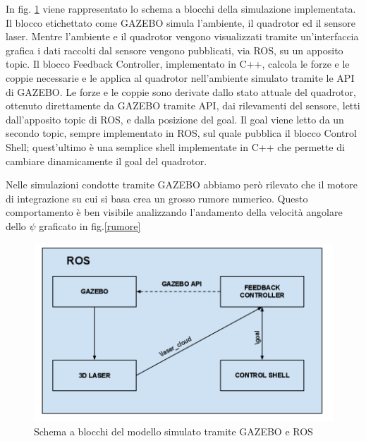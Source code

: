 \documentclass[a4paper,10pt]{article}
\begin{document}
In fig. \ref{GAZ_ROS} viene rappresentato lo schema a blocchi della simulazione implementata. Il blocco etichettato come GAZEBO simula l'ambiente, il quadrotor ed il sensore laser. Mentre l'ambiente e il quadrotor vengono visualizzati tramite un'interfaccia grafica i dati raccolti dal sensore vengono pubblicati, via ROS, su un apposito topic. Il blocco Feedback Controller, implementato in C++, calcola le forze e le coppie necessarie e le applica al quadrotor nell'ambiente simulato tramite le API di GAZEBO. Le forze e le coppie sono derivate dallo stato attuale del quadrotor, ottenuto direttamente da GAZEBO tramite API, dai rilevamenti del sensore, letti dall'apposito topic di ROS, e dalla posizione del goal. Il goal viene letto da un secondo topic, sempre implementato in ROS, sul quale pubblica il blocco Control Shell; quest'ultimo è una semplice shell implementate in C++ che permette di cambiare dinamicamente il goal del quadrotor.

Nelle simulazioni condotte tramite GAZEBO abbiamo però rilevato che il motore di integrazione su cui si basa crea un grosso rumore numerico. Questo comportamento è ben visibile analizzando l'andamento della velocità angolare dello $\psi$ graficato in fig.\ref{rumore}

\begin{figure}
\begin{center}
\includegraphics[scale=0.4]{img/gazebo-ros.png}
\end{center}
\caption{Schema a blocchi del modello simulato tramite GAZEBO e ROS}
\label{GAZ_ROS}
\end{figure}
\end{document}
